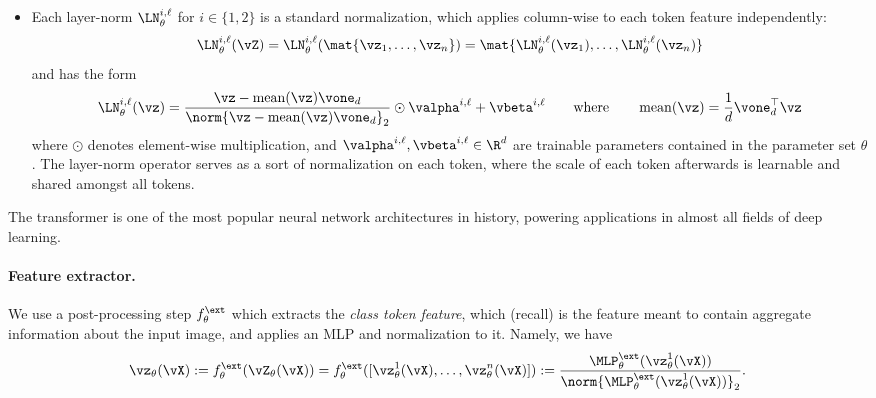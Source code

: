 \documentclass[../../book-main.tex]{subfiles}
\begin{document}
\begin{itemize}
    \begin{equation}
        \MLP_{\theta}^{\ell}(\vZ) := \vW_{\down}^{\ell}\ReLU(\vW_{\up}^{\ell}\vZ + \vb_{\up}^{\ell}\vone_{n}^{\top}) + \vb_{\down}^{\ell}\vone_{n}^{\top}
    \end{equation}
    where \(\vW_{\up}^{\ell} \in \R^{q \times d}, \vW_{\down}^{\ell} \in \R^{d \times q}, \vb_{\up}^{\ell} \in \R^{q}, \vb_{\down}^{\ell} \in \R^{d}\) are trainable parameters also contained in the parameter set \(\theta\), and \(\ReLU\) is the element-wise ReLU nonlinearity, i.e., \(\ReLU(\vM)_{ij} = \max\{M_{ij}, 0\}\). 
    \item Each layer-norm \(\LN_{\theta}^{i, \ell}\) for \(i \in \{1, 2\}\) is a standard normalization, which applies column-wise to each token feature independently:
    \begin{equation}
        \LN_{\theta}^{i, \ell}(\vZ) = \LN_{\theta}^{i, \ell}(\mat{\vz_{1}, \dots, \vz_{n}}) = \mat{\LN_{\theta}^{i, \ell}(\vz_{1}), \dots, \LN_{\theta}^{i, \ell}(\vz_{n})}
    \end{equation}
    and has the form 
    \begin{equation}
        \LN_{\theta}^{i, \ell}(\vz) = \frac{\vz - \operatorname{mean}(\vz)\vone_{d}}{\norm{\vz - \operatorname{mean}(\vz)\vone_{d}}_{2}} \odot \valpha^{i, \ell} + \vbeta^{i, \ell} \qquad \text{where} \qquad \operatorname{mean}(\vz) = \frac{1}{d}\vone_{d}^{\top}\vz
    \end{equation}
    where \(\odot\) denotes element-wise multiplication, and \(\valpha^{i, \ell}, \vbeta^{i, \ell} \in \R^{d}\) are trainable parameters contained in the parameter set \(\theta\). The layer-norm operator serves as a sort of normalization on each token, where the scale of each token afterwards is learnable and shared amongst all tokens. 
\end{itemize}

The transformer is one of the most popular neural network architectures in history, powering applications in almost all fields of deep learning. 

\paragraph{Feature extractor.} We use a post-processing step \(f_{\theta}^{\ext}\) which extracts the \textit{class token feature}, which (recall) is the feature meant to contain aggregate information about the input image, and applies an MLP and normalization to it. Namely, we have 
\begin{equation}
    \vz_{\theta}(\vX) := f_{\theta}^{\ext}(\vZ_{\theta}(\vX)) = f_{\theta}^{\ext}([\vz_{\theta}^{1}(\vX), \dots, \vz_{\theta}^{n}(\vX)]) := \frac{\MLP_{\theta}^{\ext}(\vz_{\theta}^{1}(\vX))}{\norm{\MLP_{\theta}^{\ext}(\vz_{\theta}^{1}(\vX))}_{2}}.
\end{equation} 
\end{document}
